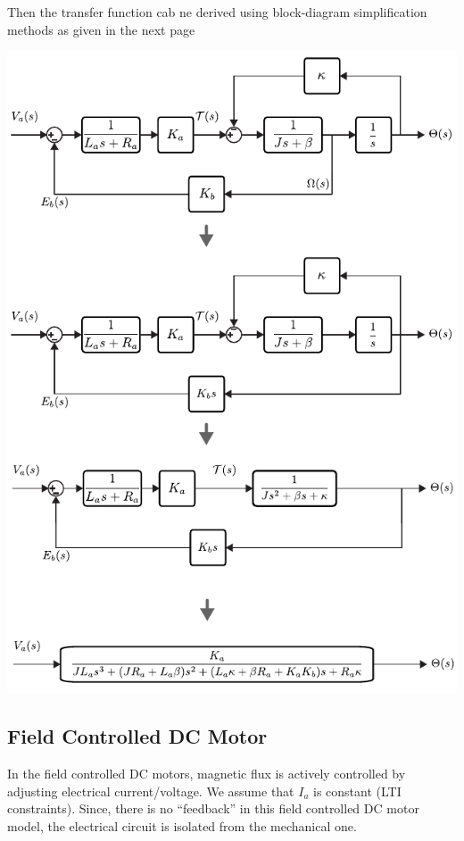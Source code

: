\documentclass[twoside]{article}
\begin{document}
  Then the transfer function cab ne derived using block-diagram simplification methods as given in the next page
  
      \begin{minipage}[h]{1\linewidth}
    \begin{center}
      \includegraphics[width=1\textwidth]{block_ex1_simplify}
    \end{center}
  \end{minipage} 
  
  \subsection{Field Controlled DC Motor}
%
In the field controlled DC motors, magnetic flux is actively controlled by adjusting
electrical current/voltage. We assume that $I_a$ is constant (LTI constraints). Since,
there is no ``feedback'' in this field controlled DC motor model, the electrical circuit
is isolated from the mechanical one. 
\end{document}
